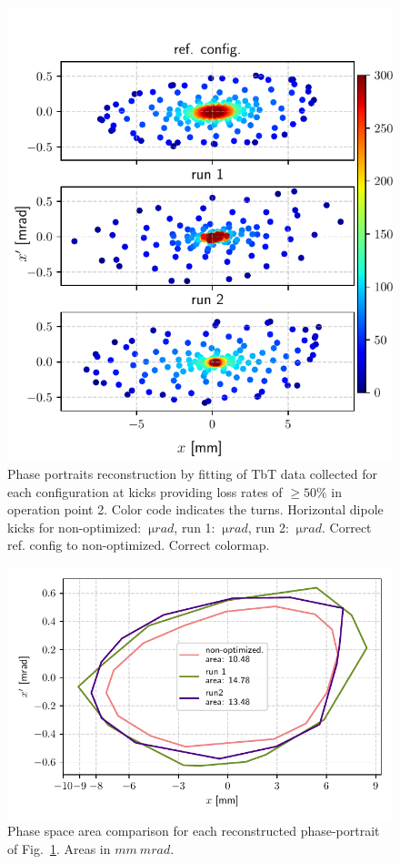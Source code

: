 \documentclass[a4paper,
               keeplastbox,   %
               ]{jacow}
\begin{document}
\begin{figure}
   \includegraphics[width=\columnwidth]{new_tunes_phase.pdf}
   \caption{Phase portraits reconstruction by fitting of TbT data collected for each configuration at kicks providing loss rates of $\geq 50\%$ in operation point 2. Color code indicates the turns. Horizontal dipole kicks for non-optimized: $~\unit{\micro rad}$, run 1: $~\unit{\micro rad}$, run 2: $~\unit{\micro rad}$. Correct ref. config to non-optimized. Correct colormap.}
   \label{fig:newtunes_phase}
\end{figure}

\begin{figure}
   \includegraphics[width=\columnwidth]{new_tunes_phase_areas.pdf}
   \caption{Phase space area comparison for each reconstructed phase-portrait of Fig.~\ref{fig:newtunes_phase}. Areas in $\unit{mm}~\unit{mrad}$.}
   \label{fig:newtunes_phase_areas}
\end{figure}
\end{document}
